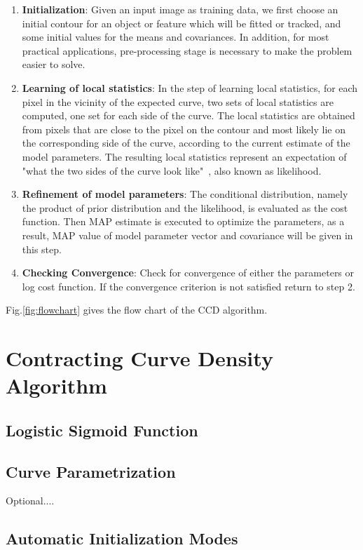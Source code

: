 \documentclass[conference]{IEEEtran}
\begin{document}
\begin{enumerate}
\item \textbf{Initialization}: Given an input image as training data, we first choose an initial
  contour for an object or feature which will be fitted or tracked, and
  some initial values for the means and covariances. In addition, for most practical
  applications, 
  pre-processing stage is necessary to make the problem easier to solve. 
\item \textbf{Learning of local statistics}: In the step of learning local
  statistics, for each pixel in the
  vicinity of the expected curve, two sets of local statistics
  are computed, one set for each side of the curve. The local statistics are obtained from
  pixels that are close to the pixel on the contour and most likely lie
  on the corresponding side of the curve, according to the current
  estimate of the model parameters. The resulting local statistics
  represent an expectation of "what the two sides of the curve look
  like"~\cite{hanek2004contracting}, also known as likelihood.
\item \textbf{Refinement of model parameters}: The conditional distribution, namely
  the product of prior distribution and  the likelihood, is evaluated
  as the cost function. Then MAP estimate is executed to optimize the
  parameters, as a result, MAP value of model parameter vector and
  covariance will be given in this step.
\item \textbf{Checking Convergence}: Check for convergence of either
  the parameters or log cost function. If the convergence criterion is
  not satisfied return to step 2.
\end{enumerate}
Fig.\ref{fig:flowchart} gives the flow chart of the CCD algorithm.

\section{Contracting Curve Density Algorithm}

\subsection{Logistic Sigmoid Function}

\subsection{Curve Parametrization}
Optional....

\subsection{Automatic Initialization Modes}
\end{document}
